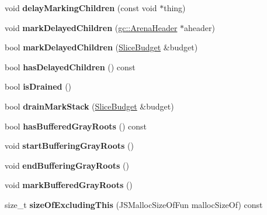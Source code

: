 \begin{DoxyCompactItemize}
\item 
\hypertarget{structjs_1_1_g_c_marker_a993a2e9185af56ca48c673b49aa50369}{void {\bfseries delay\-Marking\-Children} (const void $\ast$thing)}\label{structjs_1_1_g_c_marker_a993a2e9185af56ca48c673b49aa50369}

\item 
\hypertarget{structjs_1_1_g_c_marker_a69ac1ed55a33c78b1e81c659d2125276}{void {\bfseries mark\-Delayed\-Children} (\hyperlink{structjs_1_1gc_1_1_arena_header}{gc\-::\-Arena\-Header} $\ast$aheader)}\label{structjs_1_1_g_c_marker_a69ac1ed55a33c78b1e81c659d2125276}

\item 
\hypertarget{structjs_1_1_g_c_marker_a21ec8c9a8f015fd1c7ece55c011ab45e}{bool {\bfseries mark\-Delayed\-Children} (\hyperlink{structjs_1_1_slice_budget}{Slice\-Budget} \&budget)}\label{structjs_1_1_g_c_marker_a21ec8c9a8f015fd1c7ece55c011ab45e}

\item 
\hypertarget{structjs_1_1_g_c_marker_a7aa450235440d5ca0e74d9130ec9d105}{bool {\bfseries has\-Delayed\-Children} () const }\label{structjs_1_1_g_c_marker_a7aa450235440d5ca0e74d9130ec9d105}

\item 
\hypertarget{structjs_1_1_g_c_marker_aa31143b8a366ce0f6bde2e5bd356fafc}{bool {\bfseries is\-Drained} ()}\label{structjs_1_1_g_c_marker_aa31143b8a366ce0f6bde2e5bd356fafc}

\item 
\hypertarget{structjs_1_1_g_c_marker_a28e29a8252dbfa790d06b204e08265a7}{bool {\bfseries drain\-Mark\-Stack} (\hyperlink{structjs_1_1_slice_budget}{Slice\-Budget} \&budget)}\label{structjs_1_1_g_c_marker_a28e29a8252dbfa790d06b204e08265a7}

\item 
\hypertarget{structjs_1_1_g_c_marker_a1fec57d565b1ec061c9402fe2fa08aa0}{bool {\bfseries has\-Buffered\-Gray\-Roots} () const }\label{structjs_1_1_g_c_marker_a1fec57d565b1ec061c9402fe2fa08aa0}

\item 
\hypertarget{structjs_1_1_g_c_marker_a5884652ed1abee3d8575f1392f5d64de}{void {\bfseries start\-Buffering\-Gray\-Roots} ()}\label{structjs_1_1_g_c_marker_a5884652ed1abee3d8575f1392f5d64de}

\item 
\hypertarget{structjs_1_1_g_c_marker_a8a47c7a63066b0df7ab677b41035bafe}{void {\bfseries end\-Buffering\-Gray\-Roots} ()}\label{structjs_1_1_g_c_marker_a8a47c7a63066b0df7ab677b41035bafe}

\item 
\hypertarget{structjs_1_1_g_c_marker_a49bcba2ed1c08f036249858970aa66b0}{void {\bfseries mark\-Buffered\-Gray\-Roots} ()}\label{structjs_1_1_g_c_marker_a49bcba2ed1c08f036249858970aa66b0}

\item 
\hypertarget{structjs_1_1_g_c_marker_a805602503f2dfd4dbeb876767f651b76}{size\-\_\-t {\bfseries size\-Of\-Excluding\-This} (J\-S\-Malloc\-Size\-Of\-Fun malloc\-Size\-Of) const }\label{structjs_1_1_g_c_marker_a805602503f2dfd4dbeb876767f651b76}

\end{DoxyCompactItemize}
